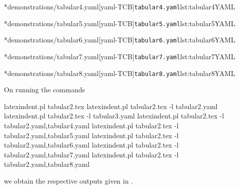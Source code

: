 	\begin{minipage}{.45\textwidth}
		\cmhlistingsfromfile[style=yaml-LST]*{demonstrations/tabular4.yaml}[yaml-TCB]{\texttt{tabular4.yaml}}{lst:tabular4YAML}
	\end{minipage}%
	\hfill
	\begin{minipage}{.48\textwidth}
		\cmhlistingsfromfile[style=yaml-LST]*{demonstrations/tabular5.yaml}[yaml-TCB]{\texttt{tabular5.yaml}}{lst:tabular5YAML}
	\end{minipage}%

	\begin{minipage}{.45\textwidth}
		\cmhlistingsfromfile[style=yaml-LST]*{demonstrations/tabular6.yaml}[yaml-TCB]{\texttt{tabular6.yaml}}{lst:tabular6YAML}
	\end{minipage}%
	\hfill
	\begin{minipage}{.48\textwidth}
		\cmhlistingsfromfile[style=yaml-LST]*{demonstrations/tabular7.yaml}[yaml-TCB]{\texttt{tabular7.yaml}}{lst:tabular7YAML}
	\end{minipage}%

	\begin{minipage}{.48\textwidth}
		\cmhlistingsfromfile[style=yaml-LST]*{demonstrations/tabular8.yaml}[yaml-TCB]{\texttt{tabular8.yaml}}{lst:tabular8YAML}
	\end{minipage}%

	On running the commands
	\begin{commandshell}
latexindent.pl tabular2.tex 
latexindent.pl tabular2.tex -l tabular2.yaml
latexindent.pl tabular2.tex -l tabular3.yaml
latexindent.pl tabular2.tex -l tabular2.yaml,tabular4.yaml
latexindent.pl tabular2.tex -l tabular2.yaml,tabular5.yaml
latexindent.pl tabular2.tex -l tabular2.yaml,tabular6.yaml
latexindent.pl tabular2.tex -l tabular2.yaml,tabular7.yaml
latexindent.pl tabular2.tex -l tabular2.yaml,tabular8.yaml
\end{commandshell}
	we obtain the respective outputs given in
	.

